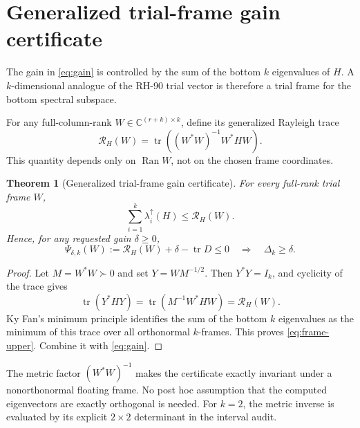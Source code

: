 \documentclass[11pt]{article}
\newtheorem{theorem}{Theorem}[section]
\theoremstyle{definition}
\theoremstyle{remark}
\newcommand{\tr}{\operatorname{tr}}
\newcommand{\Ran}{\operatorname{Ran}}
\begin{document}
\section{Generalized trial-frame gain certificate}
\label{sec:frame}

The gain in \eqref{eq:gain} is controlled by the sum of the bottom $k$
eigenvalues of $H$.  A $k$-dimensional analogue of the RH-90 trial vector is
therefore a trial frame for the bottom spectral subspace.

For any full-column-rank
$W\in\mathbb C^{(r+k)\times k}$, define its generalized Rayleigh trace
\begin{equation}
 \mathcal R_H(W)
 =\tr\!\left((W^*W)^{-1}W^*HW\right).
 \label{eq:generalized-trace}
\end{equation}
This quantity depends only on $\Ran W$, not on the chosen frame coordinates.

\begin{theorem}[Generalized trial-frame gain certificate]
\label{thm:frame}
For every full-rank trial frame $W$,
\begin{equation}
 \sum_{i=1}^k\lambda_i^\uparrow(H)
 \le\mathcal R_H(W).
 \label{eq:frame-upper}
\end{equation}
Hence, for any requested gain $\delta\ge0$,
\begin{equation}
 \boxed{
 \Psi_{\delta,k}(W)
 :=\mathcal R_H(W)+\delta-\tr D\le0
 \quad\Longrightarrow\quad
 \Delta_k\ge\delta.}
 \label{eq:frame-certificate}
\end{equation}
\end{theorem}

\begin{proof}
Let $M=W^*W\succ0$ and set $Y=WM^{-1/2}$.  Then $Y^*Y=I_k$, and cyclicity
of the trace gives
\[
 \tr(Y^*HY)=\tr(M^{-1}W^*HW)=\mathcal R_H(W).
\]
Ky Fan's minimum principle identifies the sum of the bottom $k$ eigenvalues
as the minimum of this trace over all orthonormal $k$-frames.  This proves
\eqref{eq:frame-upper}.  Combine it with \eqref{eq:gain}.
\end{proof}

The metric factor $(W^*W)^{-1}$ makes the certificate exactly invariant under
a nonorthonormal floating frame.  No post hoc assumption that the computed
eigenvectors are exactly orthogonal is needed.  For $k=2$, the metric inverse
is evaluated by its explicit $2\times2$ determinant in the interval audit.
\end{document}
